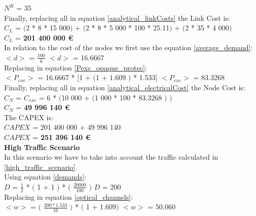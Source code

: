 $N^R$ = 35\\

Finally, replacing all in equation \ref{analytical_linkCosts} the Link Cost is:\\

$C_L$ = $($2 * 8 * 15 000$)$ + $($2 * 8 * 5 000 * 100 * 25.11$)$ + $($2 * 35 * 4 000$)$\\

$C_L$ = \textbf{201 400 000 \euro}\\

In relation to the cost of the nodes we first use the equation \ref{average_demand}:\\

$<d>$ = $\frac{100}{6}$ \qquad \qquad $<d>$ = 16.6667\\

Replacing in equation \ref{Pexc_opaque_protec}:\\

$<P_{exc}>$ = 16.6667 * $[$1 + $($1 + $1.609$ $)$ * 1.533$]$ \qquad \quad $<P_{exc}>$ = 83.3268 \\

Finally, replacing all in equation \ref{analytical_electricalCost} the Node Cost is:\\

$C_N$ = $C_{exc}$ = 6 * $($10 000 + $($1 000 * 100 * 83.3268 $)$ $)$\\

$C_N$ = \textbf{49 996 140 \euro}\\

The CAPEX is:\\
$CAPEX$ = 201 400 000 + 49 996 140\\

$CAPEX$ = \textbf{251 396 140 \euro}\\

\textbf{High Traffic Scenario}\\
In this scenario we have to take into account the traffic calculated in \ref{high_traffic_scenario}.\\

Using equation \ref{demands}:\\

$D$ = $\frac{1}{2}$ * $($ 1 + 1 $)$ * $($ $\frac{20000}{100}$ $)$ \qquad \qquad $D$ = 200\\

Replacing in equation \ref{optical_channels}:\\

$<w>$ = $($ $\frac{200 * 1.533}{16}$ $)$ * $($ 1 + 1.609$)$ \qquad \qquad $<w>$ = 50.060\\

